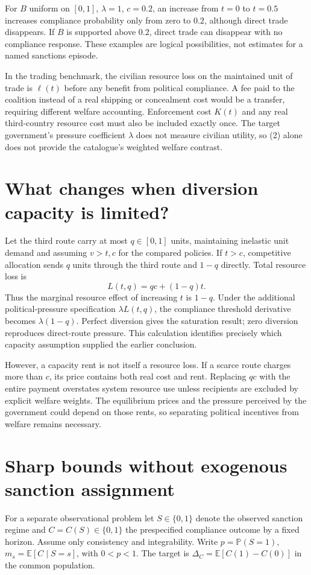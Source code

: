 \documentclass[11pt,a4paper]{article}
\newcommand{\E}{\mathbb E}
\newcommand{\Prb}{\mathbb P}
\begin{document}
For $B$ uniform on $[0,1]$, $\lambda=1$, $c=0.2$, an increase from $t=0$ to $t=0.5$ increases compliance probability only from zero to $0.2$, although direct trade disappears. If $B$ is supported above $0.2$, direct trade can disappear with no compliance response. These examples are logical possibilities, not estimates for a named sanctions episode.

In the trading benchmark, the civilian resource loss on the maintained unit of trade is $\ell(t)$ before any benefit from political compliance. A fee paid to the coalition instead of a real shipping or concealment cost would be a transfer, requiring different welfare accounting. Enforcement cost $K(t)$ and any real third-country resource cost must also be included exactly once. The target government's pressure coefficient $\lambda$ does not measure civilian utility, so (2) alone does not provide the catalogue's weighted welfare contrast.

\section{What changes when diversion capacity is limited?}
Let the third route carry at most $q\in[0,1]$ units, maintaining inelastic unit demand and assuming $v>t,c$ for the compared policies. If $t>c$, competitive allocation sends $q$ units through the third route and $1-q$ directly. Total resource loss is
\[
 L(t,q)=qc+(1-q)t.
\]
Thus the marginal resource effect of increasing $t$ is $1-q$. Under the additional political-pressure specification $\lambda L(t,q)$, the compliance threshold derivative becomes $\lambda(1-q)$. Perfect diversion gives the saturation result; zero diversion reproduces direct-route pressure. This calculation identifies precisely which capacity assumption supplied the earlier conclusion.

However, a capacity rent is not itself a resource loss. If a scarce route charges more than $c$, its price contains both real cost and rent. Replacing $qc$ with the entire payment overstates system resource use unless recipients are excluded by explicit welfare weights. The equilibrium prices and the pressure perceived by the government could depend on those rents, so separating political incentives from welfare remains necessary.

\section{Sharp bounds without exogenous sanction assignment}
For a separate observational problem let $S\in\{0,1\}$ denote the observed sanction regime and $C=C(S)\in\{0,1\}$ the prespecified compliance outcome by a fixed horizon. Assume only consistency and integrability. Write $p=\Prb(S=1)$, $m_s=\E[C\mid S=s]$, with $0<p<1$. The target is $\Delta_C=\E[C(1)-C(0)]$ in the common population.
\end{document}
